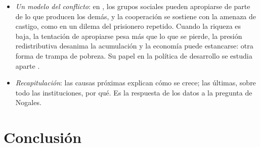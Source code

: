 \documentclass[11pt]{article}
\begin{document}
\begin{itemize}
\begin{itemize}
  \item \emph{la incidental}: las instituciones son el subproducto de otras decisiones, no se eligen por sus efectos económicos;
  \item \emph{la del conflicto social}, la que defienden: las instituciones benefician a unos grupos y perjudican a otros, y se imponen las que convienen a quien tiene el poder político, aunque reduzcan el excedente total. Las élites no reforman porque perderían su poder.
  \end{itemize}
\item \emph{Un modelo del conflicto}: en \textcite{BenhabibRustichini1996}, los grupos sociales pueden apropiarse de parte de lo que producen los demás, y la cooperación se sostiene con la amenaza de castigo, como en un dilema del prisionero repetido. Cuando la riqueza es baja, la tentación de apropiarse pesa más que lo que se pierde, la presión redistributiva desanima la acumulación y la economía puede estancarse: otra forma de trampa de pobreza. Su papel en la política de desarrollo se estudia aparte .
\item \emph{Recapitulación}: las causas próximas explican cómo se crece; las últimas, sobre todo las instituciones, por qué. Es la respuesta de los datos a la pregunta de Nogales.
\end{itemize}
\section*{Conclusión}
\end{document}
